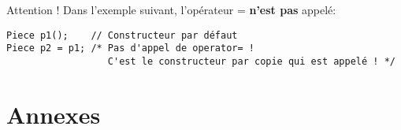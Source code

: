 \documentclass[10pt,a4paper,french]{article}
\begin{document}
Attention ! Dans l'exemple suivant, l'opérateur = \textbf{n'est pas} appelé:

\begin{verbatim}
Piece p1();    // Constructeur par défaut
Piece p2 = p1; /* Pas d'appel de operator= !
                  C'est le constructeur par copie qui est appelé ! */
\end{verbatim}

\appendix %
\part{Annexes}

\printindex
\printglossaries
\end{document}
